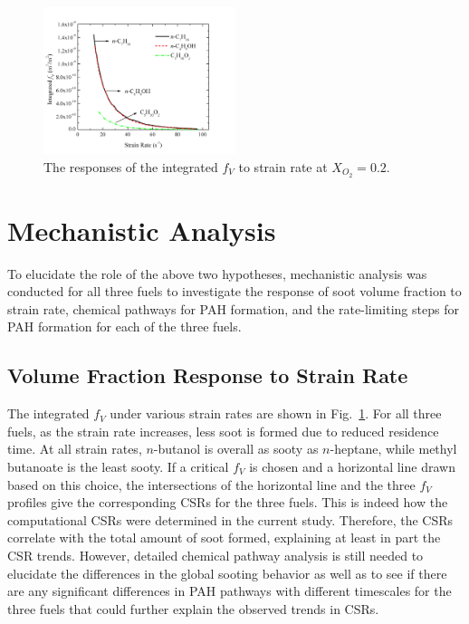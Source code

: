 \documentclass[review,3p,times]{elsarticleUS}
\begin{document}
\begin{figure}[t]
  \centering
  \scriptsize
  \vspace{-0.1in}
  \includegraphics[trim=4mm 8mm 30mm 20mm, clip=true, width=0.5\textwidth]{SV-SR.png}
  \normalsize
  \vspace{-0.1in}
  \caption{The responses of the integrated $f_V$ to strain rate at $X_{O_2}=0.2$.}
  \label{fig:fv}
\end{figure}


\section{Mechanistic Analysis}

To elucidate the role of the above two hypotheses, mechanistic analysis was conducted for all three fuels to investigate the response of soot volume fraction to strain rate, chemical pathways for PAH formation, and the rate-limiting steps for PAH formation for each of the three fuels.

\subsection{Volume Fraction Response to Strain Rate}

The integrated $f_V$ under various strain rates are shown in Fig.~\ref{fig:fv}.  For all three fuels, as the strain rate increases, less soot is formed due to reduced residence time.  At all strain rates, $n$-butanol is overall as sooty as $n$-heptane, while methyl butanoate is the least sooty.  If a critical $f_V$ is chosen and a horizontal line drawn based on this choice, the intersections of the horizontal line and the three $f_V$ profiles give the corresponding CSRs for the three fuels.  This is indeed how the computational CSRs were determined in the current study.  Therefore, the CSRs correlate with the total amount of soot formed, explaining at least in part the CSR trends. However, detailed chemical pathway analysis is still needed to elucidate the differences in the global sooting behavior as well as to see if there are any significant differences in PAH pathways with different timescales for the three fuels that could further explain the observed trends in CSRs.
\end{document}
